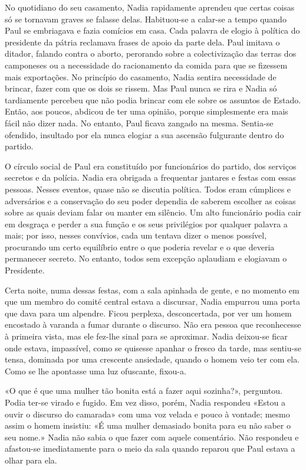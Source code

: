 No quotidiano do seu casamento, Nadia rapidamente aprendeu que certas
coisas só se tornavam graves se falasse delas. Habituou-se a calar-se a
tempo quando Paul se embriagava e fazia comícios em casa. Cada palavra
de elogio à política do presidente da pátria reclamava frases de apoio
da parte dela. Paul imitava o ditador, falando contra o aborto,
perorando sobre a colectivização das terras dos camponeses ou a
necessidade do racionamento da comida para que se fizessem mais
exportações. No princípio do casamento, Nadia sentira necessidade de
brincar, fazer com que os dois se rissem. Mas Paul nunca se rira e Nadia
só tardiamente percebeu que não podia brincar com ele sobre os assuntos
de Estado. Então, aos poucos, abdicou de ter uma opinião, porque
simplesmente era mais fácil não dizer nada. No entanto, Paul ficava
zangado na mesma. Sentia-se ofendido, insultado por ela nunca elogiar a
sua ascensão fulgurante dentro do partido.

O círculo social de Paul era constituído por funcionários do partido, dos serviços secretos e da polícia. Nadia era obrigada
a frequentar jantares e festas com essas pessoas. Nesses eventos,
quase não se discutia política. Todos eram cúmplices e adversários e a
conservação do seu poder dependia de saberem escolher as coisas sobre as
quais deviam falar ou manter em silêncio. Um alto funcionário podia cair
em desgraça e perder a sua função e os seus privilégios por qualquer
palavra a mais; por isso, nesses convívios, cada um tentava dizer o
menos possível, procurando um certo equilíbrio entre o que poderia revelar e o que deveria
permanecer secreto. No entanto, todos sem excepção aplaudiam e elogiavam
o Presidente.

Certa noite, numa dessas festas, com a sala apinhada de gente, e no
momento em que um membro do comité central estava a discursar, Nadia
empurrou uma porta que dava para um alpendre. Ficou perplexa,
desconcertada, por ver um homem encostado à varanda a fumar durante o
discurso. Não era pessoa que reconhecesse à primeira vista, mas ele
fez-lhe sinal para se aproximar. Nadia deixou-se ficar onde estava,
impassível, como se quisesse apanhar o fresco da tarde, mas sentiu-se
tensa, dominada por uma crescente ansiedade, quando o homem veio ter com
ela. Como se lhe apontasse uma luz ofuscante, fixou-a.

«O que é que uma mulher tão bonita está a fazer aqui sozinha?»,
perguntou. Podia ter-se virado e fugido. Em vez disso, porém, Nadia
respondeu «Estou a ouvir o discurso do camarada» com uma voz velada e
pouco à vontade; mesmo assim o homem insistiu: «É uma mulher demasiado
bonita para eu não saber o seu nome.» Nadia não sabia o que fazer com
aquele comentário. Não respondeu e afastou-se imediatamente para o meio
da sala quando reparou que Paul estava a olhar para ela.

